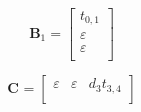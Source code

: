 \documentclass[11pt, a4paper, fleqn]{article}
\begin{document}
\begin{equation*}
\mathbf{B}_{1} = 
\left[\begin{array}{ c }
t_{0,1}\\
\varepsilon\\
\varepsilon\\
\end{array}\right]
\end{equation*}

\begin{equation*}
\mathbf{C}_{{}} = 
\left[\begin{array}{ ccc }
\varepsilon	&\varepsilon	&d_3t_{3,4}\\
\end{array}\right]
\end{equation*}
\end{document}
